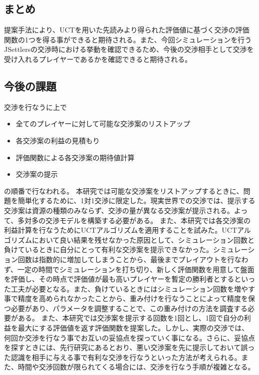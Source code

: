 \documentclass[a4, 10pt,dvipdfmx,twocolumn]{jsarticle}
\begin{document}
\subsection{まとめ}
提案手法により、UCTを用いた先読みより得られた評価値に基づく交渉の評価関数の1つを得る事ができると期待される。また、今回シミュレーションを行うJSettlersの交渉時における挙動を確認できるため、今後の交渉相手として交渉を受け入れるプレイヤーであるかを確認できると期待される。

\subsection{今後の課題}


交渉を行なうに上で

\begin{itemize}
 \item 全てのプレイヤーに対して可能な交渉案のリストアップ
 \item 各交渉案の利益の見積もり
 \item 評価関数による各交渉案の期待値計算
 \item 交渉案の提示
\end{itemize}
の順番で行なわれる。
本研究では可能な交渉案をリストアップするときに、問題を簡単化するために、1対1交渉に限定した。現実世界での交渉では、提示する交渉案は資源の種類のみならず、交渉の量が異なる交渉案が提示される。よって、多対多の交渉モデルを構築する必要がある。
また、本研究では各交渉案の利益計算を行なうためにUCTアルゴリズムを適用することを試みた。UCTアルゴリズムにおいて良い結果を残せなかった原因として、シミュレーション回数と負けているときに自分にとって有利な交渉案を提示できなかった。シミュレーション回数は指数的に増加してしまうことから、最後までプレイアウトを行なわず、一定の時間でシミュレーションを打ち切り、新しく評価関数を用意して盤面を評価し、その時点で評価値が最も高いプレイヤーを暫定の勝利者とするといった工夫が必要となる。また、負けているときにはシミュレーション回数を増やす事で精度を高められなかったことから、重み付けを行なうことによって精度を保つ必要があり、パラメータを調整することで、この重み付けの方法を調査する必要がある。
また、本研究では交渉案を提示する回数を1回とし、1回で自分の利益を最大にする評価値を返す評価関数を提案した。しかし、実際の交渉では、何回か交渉を行なう事でお互いの妥協点を探っていく事になる。さらに、妥協点を探すときには、先行研究にあるとおり、悪い交渉案を先に提示しておいて誤った認識を相手に与える事で有利な交渉を行なうといった方法が考えられる。また、時間や交渉回数が限られてくる場合には、交渉を行なう手順が複雑となる。





 
\end{document}
